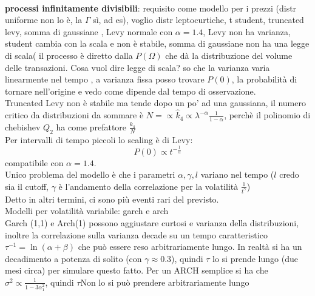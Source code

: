 \documentclass[a4paper,12pt]{article}
\theoremstyle{plain}
\theoremstyle{definition}
\newcommand{\f}[2]{\frac{#1}{#2}}
\theoremstyle{remark}
\begin{document}
\\\textbf{processi infinitamente divisibili}: requisito come modello per i prezzi (distr uniforme non lo è, la $\Gamma$ sì, ad es), voglio distr leptocurtiche, t student, truncated levy, somma di gaussiane , Levy normale con $\alpha=1.4$,
Levy non ha varianza, student cambia con la scala e non è stabile, somma di gaussiane non ha una legge di scala( il processo è diretto dalla $P(\Omega)$ che dà la distribuzione del volume delle transazioni. Cosa vuol dire legge di scala? so che la varianza varia linearmente nel tempo , a varianza fissa posso trovare $P(0)$, la probabilità di tornare nell'origine e vedo come dipende dal tempo di osservazione.\\
Truncated Levy non è stabile ma tende dopo un po' ad una gaussiana, il numero critico da distribuzioni da sommare è $N=\propto\hat{k}_4\propto \lambda^{-\alpha}\f{1}{1-\alpha}$, perchè il polinomio di chebishev $Q_2 $ ha come prefattore $\f{k_4}{N}$
\\Per intervalli di tempo piccoli lo scaling è di Levy:
\[P(0)\propto t^{-\f{1}{\alpha}}			\]
compatibile con $\alpha=1.4$.
\\Unico problema del modello è che i parametri $\alpha,\gamma, l$ variano nel tempo ($l$ credo sia il cutoff, $\gamma$ è l'andamento della correlazione per la volatilità $\f{1}{t^{\gamma}}$)
\\Detto in altri termini, ci sono più eventi rari del previsto.
\\Modelli per volatilità variabile: garch e arch
\\ Garch (1,1)  e Arch(1) possono aggiustare curtosi e varianza della distribuzioni,  inoltre la correlazione sulla varianza decade su un tempo caratteristico $\tau^{-1}=\ln (\alpha+\beta)$ che può essere reso arbitrariamente lungo. In realtà si ha un decadimento a potenza di solito (con $\gamma\approx 0.3$), quindi $\tau$ lo si prende lungo (due mesi circa) per simulare questo fatto.
Per un ARCH semplice si ha che $\sigma^2\propto \f{1}{1-3\alpha_1^2}$, quindi $\tau$Non lo si può prendere arbitrariamente lungo
\end{document}

